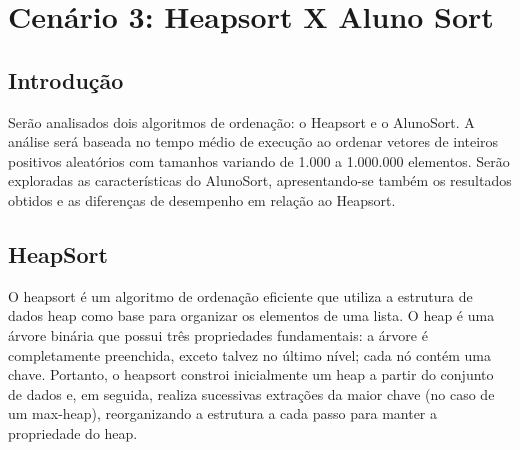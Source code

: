 \documentclass{SBCbookchapter}
\begin{document}
\begin{table}[h!]
\centering
{}
\caption{Tabela de tempos de execução dos algoritmos (em segundos).}
\end{table}




\section{Cenário 3: Heapsort X Aluno Sort}
\subsection{Introdução}
Serão analisados dois algoritmos de ordenação: o Heapsort e o AlunoSort. A análise será baseada no tempo médio de execução ao ordenar vetores de inteiros positivos aleatórios com tamanhos variando de 1.000 a 1.000.000 elementos. Serão exploradas as características do AlunoSort, apresentando-se também os resultados obtidos e as diferenças de desempenho em relação ao Heapsort.
\subsection{HeapSort}
O heapsort é um algoritmo de ordenação eficiente que utiliza a estrutura de dados heap como base para organizar os elementos de uma lista. O heap é uma árvore binária que possui três propriedades fundamentais: a árvore é completamente preenchida, exceto talvez no último nível; cada nó contém uma chave. Portanto, o heapsort constroi inicialmente um heap a partir do conjunto de dados e, em seguida, realiza sucessivas extrações da maior chave (no caso de um max-heap), reorganizando a estrutura a cada passo para manter a propriedade do heap. 
\end{document}
